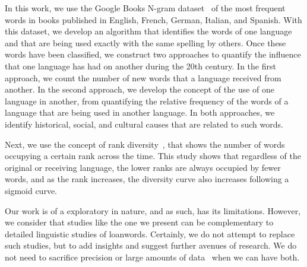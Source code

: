\documentclass[10pt,letterpaper]{article} %
\begin{document}
% 	

In this work, we use the Google Books N-gram dataset~\cite{ngramv} of the most
frequent words in books published in English, French, German, Italian, and
Spanish. With this dataset,  we develop an algorithm that identifies
the words of one language and that are being used exactly with the same 
spelling by others. Once these words
have been classified, we construct two approaches to quantify the influence that
one language has had on another during the 20th century. In the first approach, we
count the number of new words that a language received from another. In
the second approach, we develop the concept of the use of one language in
another, from quantifying the relative frequency of  the words of a language
that are being used in another language. In both approaches, we identify historical, social,
and cultural causes that are related to such words.

Next, we use the concept of rank diversity~\cite{iplosone},  that shows the number of words
occupying a certain rank across the time. This study shows that  regardless of
the original or receiving language,  the lower ranks are always occupied by
fewer words, and as the rank increases, the diversity curve also increases following a sigmoid curve. 


Our work is of a exploratory in nature, and as such, has its limitations. However, we consider that  studies like the one we present can be complementary to detailed linguistic studies of loanwords. Certainly, we do not attempt to replace such studies, but to add insights and suggest further avenues of research. We do not need to sacrifice precision or large amounts of data~\cite{Harford2014} when we can have both.

\end{document}
